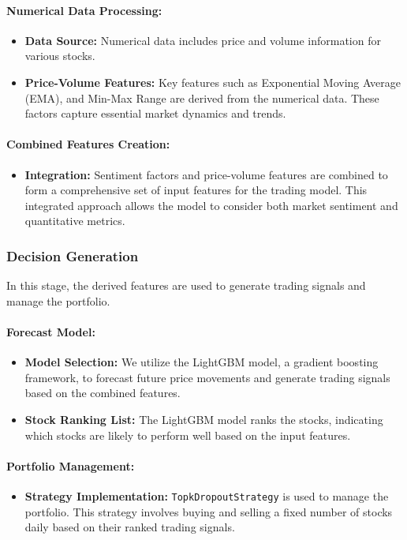 \documentclass[conference]{IEEEtran}
\begin{document}
\paragraph{Numerical Data Processing:}
\begin{itemize}
    \item \textbf{Data Source:} Numerical data includes price and volume information for various stocks.
    \item \textbf{Price-Volume Features:} Key features such as Exponential Moving Average (EMA), and Min-Max Range are derived from the numerical data. These factors capture essential market dynamics and trends.
\end{itemize}

\paragraph{Combined Features Creation:}
\begin{itemize}
    \item \textbf{Integration:} Sentiment factors and price-volume features are combined to form a comprehensive set of input features for the trading model. This integrated approach allows the model to consider both market sentiment and quantitative metrics.
\end{itemize}

\subsubsection{Decision Generation}

In this stage, the derived features are used to generate trading signals and manage the portfolio.

\paragraph{Forecast Model:}
\begin{itemize}
    \item \textbf{Model Selection:} We utilize the LightGBM model, a gradient boosting framework, to forecast future price movements and generate trading signals based on the combined features.
    \item \textbf{Stock Ranking List:} The LightGBM model ranks the stocks, indicating which stocks are likely to perform well based on the input features.
\end{itemize}

\paragraph{Portfolio Management:}
\begin{itemize}
    \item \textbf{Strategy Implementation:} \texttt{TopkDropoutStrategy} is used to manage the portfolio. This strategy involves buying and selling a fixed number of stocks daily based on their ranked trading signals.
\end{itemize}
\end{document}
